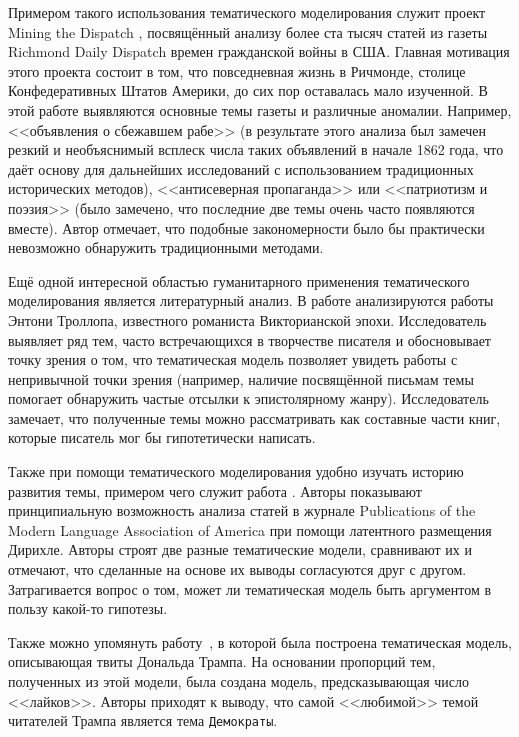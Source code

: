 Примером такого использования тематического моделирования служит проект  Mining the Dispatch \cite{monsters_men,dispatch}, посвящённый анализу более ста тысяч статей из газеты Richmond Daily Dispatch времен гражданской войны в США. Главная мотивация этого проекта состоит в том, что повседневная жизнь в Ричмонде, столице Конфедеративных Штатов Америки, до сих пор оставалась мало изученной.
В этой работе выявляются основные темы газеты и различные аномалии. Например, <<объявления о сбежавшем рабе>> (в результате этого анализа был замечен резкий и необъяснимый всплеск числа таких объявлений в начале 1862 года, что даёт основу для дальнейших исследований с использованием традиционных исторических методов), <<антисеверная пропаганда>> или <<патриотизм и поэзия>> (было замечено, что последние две темы очень часто появляются вместе). Автор отмечает, что подобные закономерности было бы практически невозможно обнаружить традиционными методами.

Ещё одной интересной областью гуманитарного применения тематического моделирования является литературный анализ. В работе \cite{buurma2015fictionality} анализируются работы Энтони Троллопа, известного романиста Викторианской эпохи. Исследователь выявляет ряд тем, часто встречающихся в творчестве писателя и обосновывает точку зрения о том, что тематическая модель позволяет увидеть работы с непривычной точки зрения (например, наличие посвящённой письмам темы помогает обнаружить частые отсылки к эпистолярному жанру). Исследователь замечает, что полученные темы можно рассматривать как составные части книг, которые писатель мог бы гипотетически написать.

Также при помощи тематического моделирования удобно изучать историю развития темы, примером чего служит работа \cite{goldstone2012can}. Авторы показывают принципиальную возможность анализа статей в журнале Publications of the Modern Language Association of America при помощи латентного размещения Дирихле. Авторы строят две разные тематические модели, сравнивают их и отмечают, что сделанные на основе их выводы согласуются друг с другом. Затрагивается вопрос о том, может ли тематическая модель быть аргументом в пользу какой-то гипотезы.

Также можно упомянуть работу~\cite{wang2016catching}, в которой была построена тематическая модель, описывающая твиты Дональда Трампа. На основании пропорций тем, полученных из этой модели, была создана модель, предсказывающая число <<лайков>>. Авторы приходят к выводу, что самой <<любимой>> темой читателей Трампа является тема \texttt{Демократы}.

